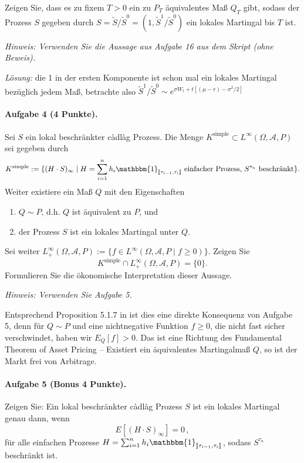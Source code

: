 \documentclass{article}
\begin{document}
Zeigen Sie, dass es zu fixem $T>0$ ein zu $P_T$ äquivalentes Maß $Q_T$ gibt, sodass der Prozess $S$ gegeben durch $S=\tilde{S}/\tilde{S}^0=(1,\tilde{S}^1/\tilde{S}^0)$ ein lokales Martingal bis $T$ ist.

\noindent\emph{Hinweis: Verwenden Sie die Aussage aus Aufgabe 16 aus dem Skript (ohne Beweis).}

\noindent\emph{Lösung:} die 1 in der ersten Komponente ist schon mal ein lokales Martingal bezüglich jedem Maß, betrachte also $\tilde{S}^1/\tilde{S}^0\sim e^{\sigma W_t+t[(\mu-r)-\sigma^2/2]}$
\paragraph{Aufgabe 4 \textnormal{(4 Punkte)}.}
Sei $S$ ein lokal beschränkter càdlàg Prozess.
Die Menge $K^\text{simple}\subset L^\infty(\Omega,\mathscr{A},P)$ sei gegeben durch
\[
  K^\text{simple}:=\{(H\cdot S)_\infty\mid H=\sum_{i=1}^n h_i\mathbbm{1}_{\rrbracket\tau_{i-1},\tau_i\rrbracket}\text{ einfacher Prozess, $S^{\tau_n}$ beschränkt}\}.
\]
Weiter existiere ein Maß $Q$ mit den Eigenschaften
\begin{enumerate}
\item $Q\sim P$, d.h. $Q$ ist äquivalent zu $P$, und
\item der Prozess $S$ ist ein lokales Martingal unter $Q$.
\end{enumerate}
Sei weiter $L_+^\infty(\Omega,\mathscr{A},P):=\{f\in L^\infty(\Omega,\mathscr{A},P\mid f\geq0)\}$.
Zeigen Sie
\[
K^\text{simple}\cap L^\infty_+(\Omega,\mathscr{A},P)=\{0\}.
\]
Formulieren Sie die ökonomische Interpretation dieser Aussage.

\noindent\emph{Hinweis: Verwenden Sie Aufgabe 5.}

Entsprechend Proposition 5.1.7 in \cite{Delbaen2006} ist dies eine direkte Konsequenz von Aufgabe 5, denn für $Q\sim P$ und eine nichtnegative Funktion $f\geq0$, die nicht fast sicher verschwindet, haben wir $E_Q[f]>0$.
Das ist eine Richtung des Fundamental Theorem of Asset Pricing -- Existiert ein äquivalentes Martingalmaß $Q$, so ist der Markt frei von Arbitrage.

\paragraph{Aufgabe 5 \textnormal{(Bonus 4 Punkte)}.}
Zeigen Sie: Ein lokal beschränkter càdlàg Prozess $S$ ist ein lokales Martingal genau dann, wenn
\[
  E[(H\cdot S)_\infty]=0\,,
\]
für alle einfachen Prozesse $H=\sum_{i=1}^nh_i\mathbbm{1}_{\rrbracket \tau_{i-1},\tau_i\rrbracket}$, sodass $S^{\tau_n}$ beschränkt ist.
\end{document}
